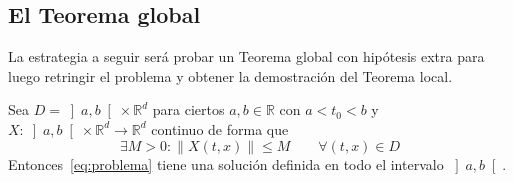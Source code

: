 \subsection{El Teorema global}
\noindent
La estrategia a seguir será probar un Teorema global con hipótesis extra para luego retringir el problema y obtener la demostración del Teorema local.

\begin{teo}\label{teo:global_existencia}
    Sea $D=\left]a,b\right[\times \mathbb{R}^d$ para ciertos $a,b\in \mathbb{R}$ con $a<t_0<b$ y $X:\left]a,b\right[\times \mathbb{R}^d\to \mathbb{R}^d$ continuo de forma que
    \begin{equation*}
        \exists M>0 : \|X(t,x)\|\leq M \qquad \forall (t,x)\in D
    \end{equation*}
    Entonces~\eqref{eq:problema} tiene una solución definida en todo el intervalo $\left]a,b\right[$.
\end{teo}

